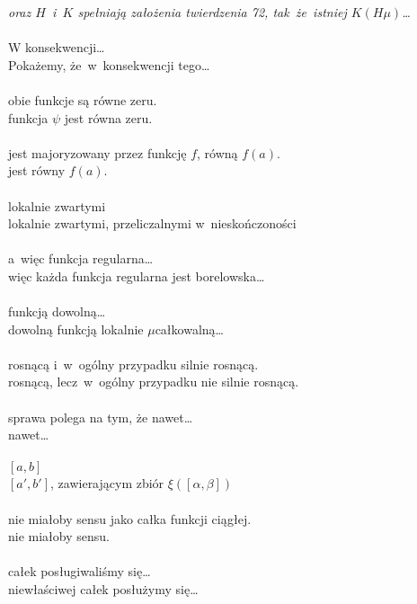 \documentclass[a4paper,11pt]{article}
\begin{document}
\Pow \emph{oraz $H$~i~$K$ spełniają założenia twierdzenia 72, tak~że~istniej $K( H \mu )$\ldots}\\
 \\
\Jest W konsekwencji\ldots \\
\Pow Pokażemy, że~w~konsekwencji tego\ldots \\
 \\
\Jest obie funkcje są równe zeru. \\
\Pow funkcja $\psi$ jest równa zeru. \\
 \\
\Jest jest majoryzowany przez funkcję $f$, równą $f( a )$. \\
\Pow jest równy $f( a )$.\\
 \\
\Jest lokalnie zwartymi \\
\Pow lokalnie zwartymi, przeliczalnymi w~nieskończoności \\
 \\
\Jest a~więc funkcja regularna\ldots \\
\Pow więc każda funkcja regularna jest borelowska\ldots \\
 \\
\Jest funkcją dowolną\ldots \\
\Pow dowolną funkcją lokalnie $\mu$\dywiz całkowalną\ldots \\
 \\
\Jest rosnącą i~w~ogólny przypadku silnie rosnącą. \\
\Pow rosnącą, lecz~w~ogólny przypadku nie silnie rosnącą. \\
 \\
\Jest sprawa polega na tym, że nawet\ldots \\
\Pow nawet\ldots \\
 \\
\Jest $[ a, b ]$ \\
\Pow $[ a', b' ]$, zawierającym zbiór $\xi( [ \alpha, \beta ] )$ \\
 \\
\Jest nie miałoby sensu jako całka funkcji ciągłej. \\
\Pow nie miałoby sensu. \\
 \\
\Jest całek posługiwaliśmy się\ldots \\
\Pow niewłaściwej całek posłużymy się\ldots \\
\end{document}
